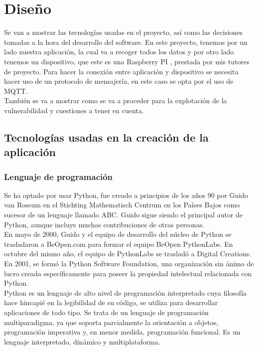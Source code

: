 \chapter{Diseño}

Se van a mostrar las tecnologías usadas en el proyecto, así como las decisiones tomadas a la hora del desarrollo del software. En este proyecto, tenemos por un lado nuestra aplicación, la cual va a recoger todos los datos y por otro lado tenemos un dispositivo, que este es una Raspberry PI \cite{raspberry-specs}, prestada por mis tutores de proyecto. Para hacer la conexión entre aplicación y dispositivo se necesita hacer uso de un protocolo de mensajería, en este caso se opta por el uso de MQTT. \\

También se va a mostrar como se va a proceder para la explotación de la vulnerabilidad y cuestiones a tener en cuenta.

\section{Tecnologías usadas en la creación de la aplicación}

\subsection{Lenguaje de programación}

Se ha optado por usar Python, fue creado a principios de los años 90 por Guido van Rossum en el Stichting Mathematisch Centrum en los Países Bajos como sucesor de un lenguaje llamado ABC. Guido sigue siendo el principal autor de Python, aunque incluye muchas contribuciones de otras personas. \\

En mayo de 2000, Guido y el equipo de desarrollo del núcleo de Python se trasladaron a BeOpen.com para formar el equipo BeOpen PythonLabs. En octubre del mismo año, el equipo de PythonLabs se trasladó a Digital Creations. En 2001, se formó la Python Software Foundation, una organización sin ánimo de lucro creada específicamente para poseer la propiedad intelectual relacionada con Python. \cite{python-history} \\

Python es un lenguaje de alto nivel de programación interpretado cuya filosofía hace hincapié en la legibilidad de su código, se utiliza para desarrollar aplicaciones de todo tipo. Se trata de un lenguaje de programación multiparadigma, ya que soporta parcialmente la orientación a objetos, programación imperativa y, en menor medida, programación funcional. Es un lenguaje interpretado, dinámico y multiplataforma. \cite{python-wiki} \\


